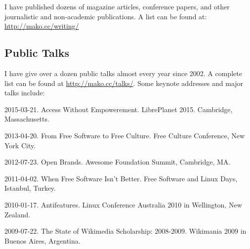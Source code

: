 \documentclass[10pt]{article}
\newenvironment{cvlist}{
\begin{list}{}{\leftmargin=3.0em \itemindent=-3.0em}
  \setlength{\itemsep}{0pt}
  \setlength{\parskip}{0em}
  \setlength{\parsep}{1em}
  \setlength{\parindent}{0em}}
{\vspace{1em}
\end{list}}
\begin{document}
I have published dozens of magazine articles, conference papers, and other journalistic and non-academic publications. A list can be found at: \url{http://mako.cc/writing/}

\vspace{2.5em}

\subsection{Public Talks}

I have give over a dozen public talks almost every year since 2002. A complete list can be found at \url{http://mako.cc/talks/}. Some keynote addresses and major talks include:

\begin{cvlist}
\item  2015-03-21. Access Without Empowerement. LibrePlanet 2015. Cambridge, Massachusetts. 
\item 2013-04-20. From Free Software to Free Culture. Free Culture Conference, New York City.
\item 2012-07-23. Open Brands. Awesome Foundation Summit, Cambridge, MA.
\item 2011-04-02. When Free Software Isn't Better. Free Software and Linux Days, Istanbul, Turkey.
\item 2010-01-17. Antifeatures. Linux Conference Australia 2010 in Wellington, New Zealand. %
\item 2009-07-22. The State of Wikimedia Scholarship: 2008-2009. Wikimania 2009 in Buenos Aires, Argentina.

\end{cvlist}
\end{document}

